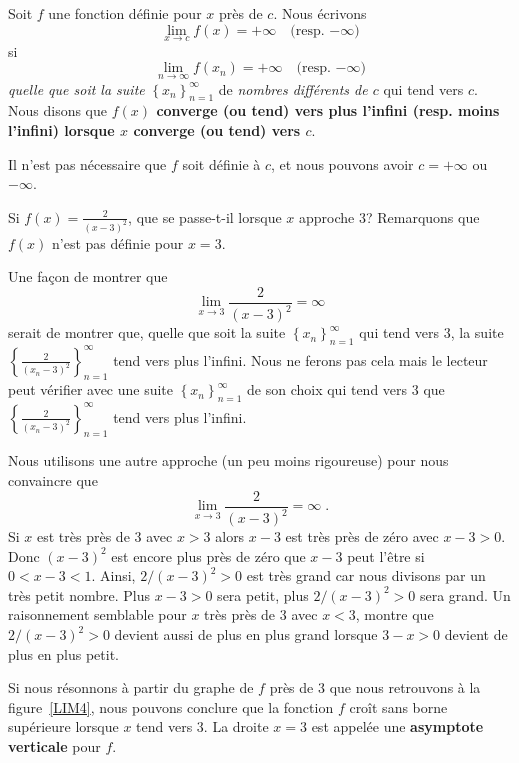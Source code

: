 {\begin{defn} 
Soit $f$ une fonction définie pour $x$ près de $c$.  Nous écrivons
\[
\lim_{x\rightarrow c} f(x) = +\infty  \quad \text{(resp. $-\infty$)}
\]
si
\[
\lim_{n\rightarrow \infty} f(x_n) = +\infty  \quad \text{(resp. $-\infty$)} 
\]
{\em quelle que soit la suite}
$\displaystyle \left\{x_n\right\}_{n=1}^\infty$ de
{\em nombres différents de $c$} qui tend vers $c$.
Nous disons que {\bfseries $f(x)$ converge (ou tend) vers plus l'infini
(resp. moins l'infini) lorsque $x$ converge (ou tend) vers $c$}.

Il n'est pas nécessaire que $f$ soit définie à $c$, et nous pouvons avoir
$c = +\infty$ ou $-\infty$.
\label{def_of_inf_lim_of_f}
\end{defn}

\begin{egg}
Si $\displaystyle f(x) = \frac{2}{(x-3)^2}$, que se passe-t-il lorsque
$x$ approche $3$?  Remarquons que $f(x)$ n'est pas définie pour
$x=3$.

Une façon de montrer que
\[
\lim_{x\rightarrow 3} \frac{2}{(x-3)^2} = \infty
\]
serait de montrer que, quelle que soit la suite
$\displaystyle \left\{x_n\right\}_{n=1}^\infty$ qui tend vers $3$, la
suite
$\displaystyle \left\{\frac{2}{(x_n-3)^2}\right\}_{n=1}^\infty$
tend vers plus l'infini.   Nous ne ferons pas cela mais le lecteur
peut vérifier avec une suite
$\displaystyle \left\{x_n\right\}_{n=1}^\infty$
de son choix qui tend vers $3$ que
$\displaystyle \left\{\frac{2}{(x_n-3)^2}\right\}_{n=1}^\infty$
tend vers plus l'infini.

Nous utilisons une autre approche (un peu moins rigoureuse) pour nous
convaincre que
\[
\lim_{x\rightarrow 3} \frac{2}{(x-3)^2} = \infty \; .
\]
Si $x$ est très près de $3$ avec $x>3$ alors $x-3$ est très près de
zéro avec $x-3>0$.  Donc $(x-3)^2$ est encore plus près de zéro que
$x-3$ peut l'être si $0<x-3<1$.  Ainsi, $2/(x-3)^2 >0$ est très grand
car nous divisons par un très petit nombre.   Plus $x-3>0$ sera petit, plus
$2/(x-3)^2 >0$ sera grand.  Un raisonnement semblable
pour $x$ très près de $3$ avec $x<3$, montre que $2/(x-3)^2>0$ devient
aussi de plus en plus grand lorsque $3-x>0$ devient de plus en plus
petit.

Si nous résonnons à partir du graphe de $f$ près de $3$ que nous retrouvons
à la figure~\ref{LIM4}, nous pouvons conclure que la fonction $f$ croît
sans borne supérieure lorsque $x$ tend vers $3$.  La droite $x=3$ est
appelée une
{\bfseries asymptote verticale} pour $f$. 
\end{egg}

}
